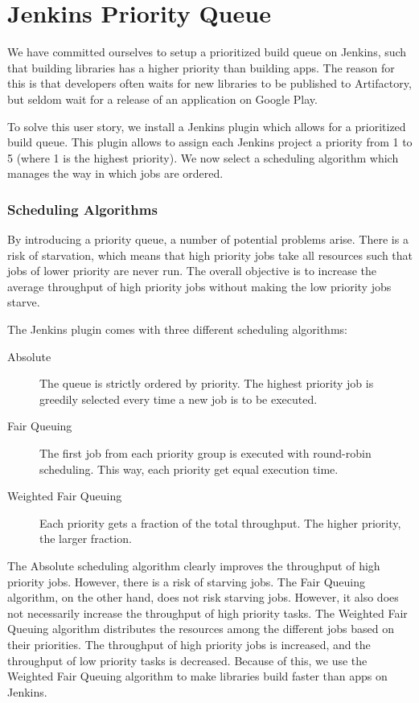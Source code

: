 \chapter{Jenkins Priority Queue}
We have committed ourselves to setup a prioritized build queue on Jenkins, such that building libraries has a higher priority than building apps. The reason for this is that developers often waits for new libraries to be published to Artifactory, but seldom wait for a release of an application on Google Play.

To solve this user story, we install a Jenkins plugin\parencite{jenkins-priority-plugin} which allows for a prioritized build queue. This plugin allows to assign each Jenkins project a priority from 1 to 5 (where 1 is the highest priority). We now select a scheduling algorithm which manages the way in which jobs are ordered.

\subsection{Scheduling Algorithms}
By introducing a priority queue, a number of potential problems arise. There is a risk of starvation, which means that high priority jobs take all resources such that jobs of lower priority are never run. The overall objective is to increase the average throughput of high priority jobs without making the low priority jobs starve.

The Jenkins plugin comes with three different scheduling algorithms:
\begin{description}
  \item[Absolute] The queue is strictly ordered by priority. The highest priority job is greedily selected every time a new job is to be executed.
  \item[Fair Queuing] The first job from each priority group is executed with round-robin scheduling. This way, each priority get equal execution time.
  \item[Weighted Fair Queuing] Each priority gets a fraction of the total throughput. The higher priority, the larger fraction. 
\end{description}
The Absolute scheduling algorithm clearly improves the throughput of high priority jobs. However, there is a risk of starving jobs. The Fair Queuing algorithm, on the other hand, does not risk starving jobs. However, it also does not necessarily increase the throughput of high priority tasks. The Weighted Fair Queuing algorithm distributes the resources among the different jobs based on their priorities. The throughput of high priority jobs is increased, and the throughput of low priority tasks is decreased. Because of this, we use the Weighted Fair Queuing algorithm to make libraries build faster than apps on Jenkins.
